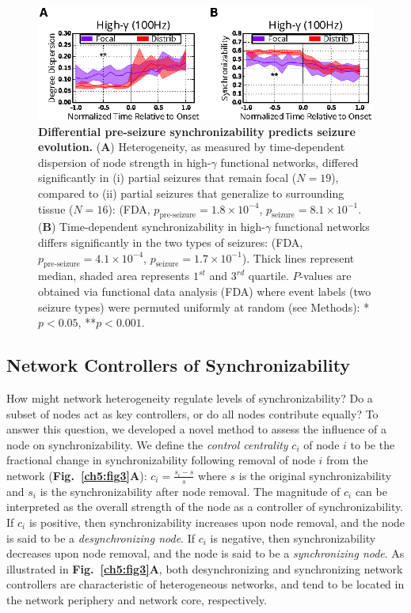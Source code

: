 \begin{figure}[H]
    \centering
    \includegraphics[width=\textwidth]{panel2.eps}
    \caption[Global synchronizability predicts seizure evolution]{\textbf{Differential pre-seizure synchronizability predicts seizure evolution.} (\textbf{A}) Heterogeneity, as measured by time-dependent dispersion of node strength in high-$\gamma$ functional networks, differed significantly in (i) partial seizures that remain focal ($N=19$), compared to (ii) partial seizures that generalize to surrounding tissue ($N=16$): (FDA, $p_\text{pre-seizure}=1.8\times10^{-4}$, $p_\text{seizure}=8.1\times10^{-1}$. (\textbf{B}) Time-dependent synchronizability in high-$\gamma$ functional networks differs significantly in the two types of seizures: (FDA, $p_\text{pre-seizure}=4.1\times10^{-4}$, $p_\text{seizure}=1.7\times10^{-1}$). Thick lines represent median, shaded area represents $1^{st}$ and $3^{rd}$ quartile. $P$-values are obtained via functional data analysis (FDA) where event labels (two seizure types) were permuted uniformly at random (see Methods): *$p<0.05$, **$p<0.001$. \label{ch5:fig2}}
\end{figure}


\subsection{Network Controllers of Synchronizability}
How might network heterogeneity regulate levels of synchronizability? Do a subset of nodes act as key controllers, or do all nodes contribute equally? To answer this question, we developed a novel method to assess the influence of a node on synchronizability. We define the \emph{control centrality} $c_i$ of node $i$ to be the fractional change in synchronizability following removal of node $i$ from the network (\textbf{Fig.~\ref{ch5:fig3}A}): $c_i=\frac{s_i-s}{s}$ where $s$ is the original synchronizability and $s_i$ is the synchronizability after node removal. The magnitude of $c_i$ can be interpreted as the overall strength of the node as a controller of synchronizability. If $c_i$ is positive, then synchronizability increases upon node removal, and the node is said to be a \emph{desynchronizing node}. If $c_i$ is negative, then synchronizability decreases upon node removal, and the node is said to be a \emph{synchronizing node}. As illustrated in \textbf{Fig.~\ref{ch5:fig3}A}, both desynchronizing and synchronizing network controllers are characteristic of heterogeneous networks, and tend to be located in the network periphery and network core, respectively.

